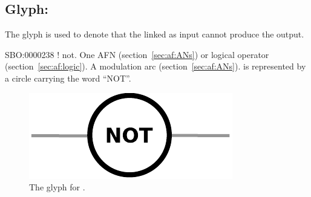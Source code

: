 \subsection{Glyph: }
\label{sec:af:not}

The glyph  is used to denote that the  linked as input cannot produce the output.

\begin{glyphDescription}
 \glyphSboTerm SBO:0000238 ! not.
 \glyphOrigin One AFN (section~\ref{sec:af:ANs}) or logical operator (section~\ref{sec:af:logic}).
 \glyphTarget A modulation arc (section~\ref{sec:af:ANs}).
 \glyphNode {} is represented by a circle carrying the word ``NOT''.
 \end{glyphDescription}

\begin{figure}[H]
  \centering
  \includegraphics[scale = 0.5]{images/not}
  \caption{The \AF glyph for .}
  \label{fig:af:not}
\end{figure}
